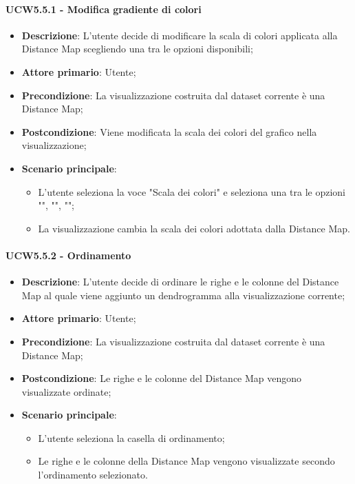 \paragraph{UCW5.5.1 - Modifica gradiente di colori}
\label{par:ucw5.5.1}
\begin{itemize}
    \item \textbf{Descrizione}: L'utente decide di modificare la scala di colori applicata alla Distance Map scegliendo una tra le opzioni disponibili;
    \item \textbf{Attore primario}: Utente;
    \item \textbf{Precondizione}: La visualizzazione costruita dal dataset corrente è una Distance Map;
    \item \textbf{Postcondizione}: Viene modificata la scala dei colori del grafico nella visualizzazione;
    \item \textbf{Scenario principale}:
    \begin{itemize}
        \item L'utente seleziona la voce "Scala dei colori" e seleziona una tra le opzioni  "", "", "";
        \item La visualizzazione cambia la scala dei colori adottata dalla Distance Map.
    \end{itemize}
\end{itemize}

\paragraph{UCW5.5.2 - Ordinamento}
\label{par:ucw5.5.2}
\begin{itemize}
    \item \textbf{Descrizione}: L'utente decide di ordinare le righe e le colonne del Distance Map al quale viene aggiunto un dendrogramma alla visualizzazione corrente;
    \item \textbf{Attore primario}: Utente;
    \item \textbf{Precondizione}: La visualizzazione costruita dal dataset corrente è una Distance Map;
    \item \textbf{Postcondizione}: Le righe e le colonne del Distance Map vengono visualizzate ordinate;
    \item \textbf{Scenario principale}:
    \begin{itemize}
        \item L'utente seleziona la casella di ordinamento;
        \item Le righe e le colonne della Distance Map vengono visualizzate secondo l'ordinamento selezionato.
    \end{itemize}
\end{itemize}

